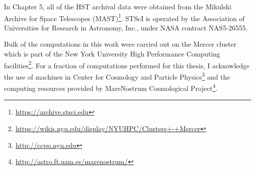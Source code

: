In Chapter 5, all of the HST archival data were obtained from the Mikulski Archive for Space Telescopes (MAST)\footnote{\url{https://archive.stsci.edu}}. STScI is operated by the Association of Universities for Research in Astronomy, Inc., under NASA contract NAS5-26555.
 
Bulk of the computations in this work were carried out on the Mercer cluster which is part of the New York University High Performance Computing facilities\footnote{\url{https://wikis.nyu.edu/display/NYUHPC/Clusters+-+Mercer}}. For a fraction of computations performed for this thesis, I acknowledge the use of machines in Center for Cosmology and Particle Physics\footnote{\url{http://ccpp.nyu.edu}} and the computing resources provided by MareNostrum Cosmological Project\footnote{\url{http://astro.ft.uam.es/marenostrum/}}. 
